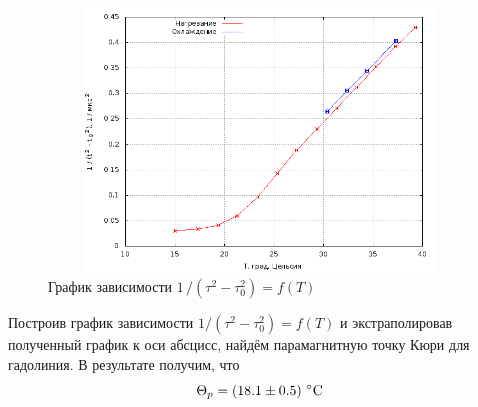 \documentclass[12pt]{article}
\begin{document}
\begin{figure}[h!]
	\centering
	\includegraphics[height = 7cm, width = 12cm]{plot1.png}
	\caption{График зависимости $1 \, / \left(\tau^2 - \tau_0^2\right) = f(T)$}
\end{figure}
\newpage
\par
	Построив график зависимости $1 / \left(\tau^2 - \tau_0^2\right) = f(T)$ и экстраполировав полученный график к оси абсцисс, найдём парамагнитную точку Кюри для гадолиния. В результате получим, что
\[
	\Theta_p = \left(18.1 \pm 0.5 \right) \, \degree \text{C}
\]
\end{document}

